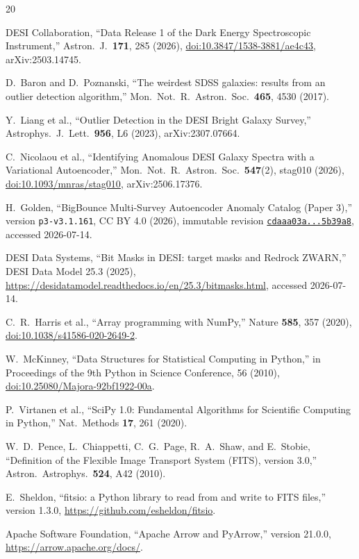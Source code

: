 \documentclass[twocolumn]{aastex701}
\begin{document}
\begin{thebibliography}{20}

DESI Collaboration, ``Data Release 1 of the Dark Energy Spectroscopic Instrument,''
Astron.\ J.\ \textbf{171}, 285 (2026),
\href{https://doi.org/10.3847/1538-3881/ae4c43}{doi:10.3847/1538-3881/ae4c43},
arXiv:2503.14745.

D.\ Baron and D.\ Poznanski, ``The weirdest SDSS galaxies: results from an outlier detection
algorithm,'' Mon.\ Not.\ R.\ Astron.\ Soc.\ \textbf{465}, 4530 (2017).

Y.\ Liang et al., ``Outlier Detection in the DESI Bright Galaxy Survey,''
Astrophys.\ J.\ Lett.\ \textbf{956}, L6 (2023), arXiv:2307.07664.

C.\ Nicolaou et al., ``Identifying Anomalous DESI Galaxy Spectra with a Variational Autoencoder,''
Mon.\ Not.\ R.\ Astron.\ Soc.\ \textbf{547}(2), stag010 (2026),
\href{https://doi.org/10.1093/mnras/stag010}{doi:10.1093/mnras/stag010},
arXiv:2506.17376.

H.\ Golden, ``BigBounce Multi-Survey Autoencoder Anomaly Catalog (Paper 3),''
version \texttt{p3-v3.1.161}, CC BY 4.0 (2026), immutable revision
\href{https://huggingface.co/datasets/bamfai/bigbounce-anomaly-catalog/tree/cdaaa03a72c69d86f011be128d93f261dc5b39a8}{\texttt{cdaaa03a...5b39a8}}, accessed 2026-07-14.

DESI Data Systems, ``Bit Masks in DESI: target masks and Redrock ZWARN,''
DESI Data Model 25.3 (2025),
\url{https://desidatamodel.readthedocs.io/en/25.3/bitmasks.html}, accessed 2026-07-14.

C.\ R.\ Harris et al., ``Array programming with NumPy,'' Nature \textbf{585}, 357 (2020),
\href{https://doi.org/10.1038/s41586-020-2649-2}{doi:10.1038/s41586-020-2649-2}.

W.\ McKinney, ``Data Structures for Statistical Computing in Python,'' in
Proceedings of the 9th Python in Science Conference, 56 (2010),
\href{https://doi.org/10.25080/Majora-92bf1922-00a}{doi:10.25080/Majora-92bf1922-00a}.

P.\ Virtanen et al., ``SciPy 1.0: Fundamental Algorithms for Scientific Computing in Python,''
Nat.\ Methods \textbf{17}, 261 (2020).

W.\ D.\ Pence, L.\ Chiappetti, C.\ G.\ Page, R.\ A.\ Shaw, and E.\ Stobie,
``Definition of the Flexible Image Transport System (FITS), version 3.0,''
Astron.\ Astrophys.\ \textbf{524}, A42 (2010).

E.\ Sheldon, ``fitsio: a Python library to read from and write to FITS files,''
version 1.3.0, \url{https://github.com/esheldon/fitsio}.

Apache Software Foundation, ``Apache Arrow and PyArrow,'' version 21.0.0,
\url{https://arrow.apache.org/docs/}.

\end{thebibliography}
\end{document}
